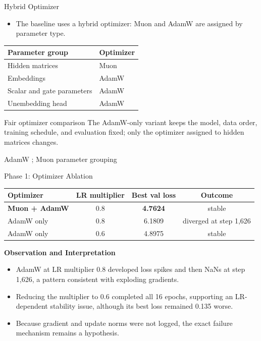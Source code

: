 \documentclass[aspectratio=169,11pt]{beamer}
\newcommand{\smallcite}[1]{\hfill{\tiny\color{gray}#1}}
\begin{document}
\begin{frame}{Hybrid Optimizer}
  \small
  \begin{itemize}
    \item The baseline uses a hybrid optimizer: Muon and AdamW are assigned by parameter type.
  \end{itemize}
  \vspace{0.25cm}
  \begin{center}
    \renewcommand{\arraystretch}{1.5}
    \begin{tabular}{>{\raggedright\arraybackslash}p{}
                    >{\raggedright\arraybackslash}p{}}
      \toprule
      \textbf{Parameter group} & \textbf{Optimizer} \\
      \midrule
      Hidden matrices & Muon \\
      Embeddings & AdamW \\
      Scalar and gate parameters & AdamW \\
      Unembedding head & AdamW \\
      \bottomrule
    \end{tabular}
  \end{center}
  \vspace{0.4cm}
  \begin{block}{Fair optimizer comparison}
    The AdamW-only variant keeps the model, data order, training schedule, and
    evaluation fixed; only the optimizer assigned to hidden matrices changes.
  \end{block}
  \smallcite{AdamW \cite{loshchilov2019adamw}; Muon parameter grouping \cite{jordan2024muon}}
\end{frame}

\begin{frame}{Phase 1: Optimizer Ablation}
  \small
  \begin{tabular}{p{}ccc}
    \toprule
    Optimizer & LR multiplier & Best val loss & Outcome \\
    \midrule
    \textbf{Muon + AdamW} & 0.8 & \textbf{4.7624} & stable \\
    AdamW only & 0.8 & 6.1809 & diverged at step 1,626 \\
    AdamW only & 0.6 & 4.8975 & stable \\
    \bottomrule
  \end{tabular}
  \par
  \vspace{0.45cm}
  \textbf{Observation and Interpretation}
  \begin{itemize}
    \item AdamW at LR multiplier 0.8 developed loss spikes and then NaNs at step 1,626,
      a pattern consistent with exploding gradients.
    \item Reducing the multiplier to 0.6 completed all 16 epochs, supporting an
      LR-dependent stability issue, although its best loss remained 0.135 worse.
    \item Because gradient and update norms were not logged, the exact failure
      mechanism remains a hypothesis.
  \end{itemize}
\end{frame}
\end{document}
